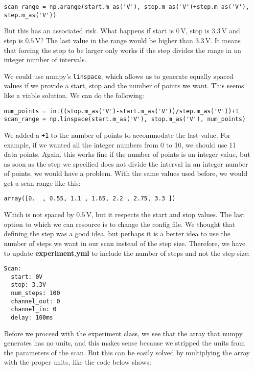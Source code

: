 \begin{verbatim}
scan_range = np.arange(start.m_as('V'), stop.m_as('V')+step.m_as('V'), step.m_as('V'))
\end{verbatim}

But this has an associated risk. What happens if start is $0\,\textrm{V}$, stop is $3.3\,\textrm{V}$ and step is $0.5\,\textrm{V}$? The last value in the range would be higher than $3.3\,\textrm{V}$. It means that forcing the stop to be larger only works if the step divides the range in an integer number of intervals.

We could use numpy's \texttt{linspace}, which allows us to generate equally spaced values if we provide a start, stop and the number of points we want. This seems like a viable solution. We can do the following:

\begin{verbatim}
num_points = int((stop.m_as('V')-start.m_as('V'))/step.m_as('V'))+1
scan_range = np.linspace(start.m_as('V'), stop.m_as('V'), num_points)
\end{verbatim}

We added a \texttt{+1} to the number of points to accommodate the last value. For example, if we wanted all the integer numbers from 0 to 10, we should use 11 data points. Again, this works fine if the number of points is an integer value, but as soon as the step we specified does not divide the interval in an integer number of points, we would have a problem. With the same values used before, we would get a scan range like this:

\begin{verbatim}
array([0.  , 0.55, 1.1 , 1.65, 2.2 , 2.75, 3.3 ])
\end{verbatim}

Which is not spaced by $0.5\,\textrm{V}$, but it respects the start and stop values. The last option to which we can resource is to change the config file. We thought that defining the step was a good idea, but perhaps it is a better idea to use the number of steps we want in our scan instead of the step size. Therefore, we have to update \textbf{experiment.yml} to include the number of steps and not the step size:

\begin{verbatim}
Scan:
  start: 0V
  stop: 3.3V
  num_steps: 100
  channel_out: 0
  channel_in: 0
  delay: 100ms
\end{verbatim}

Before we proceed with the experiment class, we see that the array that numpy generates has no units, and this makes sense because we stripped the units from the parameters of the scan. But this can be easily solved by multiplying the array with the proper units, like the code below shows:

